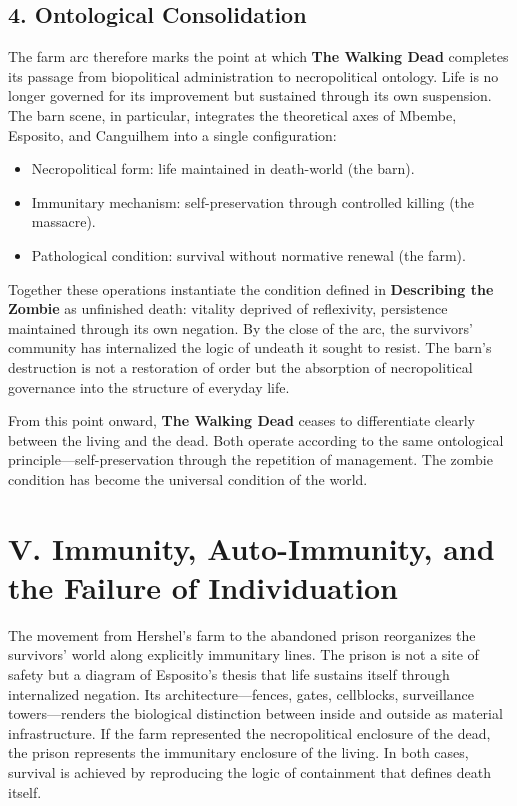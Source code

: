 \documentclass[11pt]{article}
\begin{document}
\subsection*{4. Ontological Consolidation}
\label{sec:org6c1e42b}

The farm arc therefore marks the point at which \textbf{The Walking Dead} completes its passage from biopolitical administration to necropolitical ontology.  Life is no longer governed for its improvement but sustained through its own suspension.  The barn scene, in particular, integrates the theoretical axes of Mbembe, Esposito, and Canguilhem into a single configuration:  

\begin{itemize}
\item Necropolitical form: life maintained in death-world (the barn).
\item Immunitary mechanism: self-preservation through controlled killing (the massacre).
\item Pathological condition: survival without normative renewal (the farm).
\end{itemize}

Together these operations instantiate the condition defined in \textbf{Describing the Zombie} as unfinished death: vitality deprived of reflexivity, persistence maintained through its own negation.  By the close of the arc, the survivors’ community has internalized the logic of undeath it sought to resist.  The barn’s destruction is not a restoration of order but the absorption of necropolitical governance into the structure of everyday life.  

From this point onward, \textbf{The Walking Dead} ceases to differentiate clearly between the living and the dead.  Both operate according to the same ontological principle—self-preservation through the repetition of management.  The zombie condition has become the universal condition of the world.  
\section*{V. Immunity, Auto-Immunity, and the Failure of Individuation}
\label{sec:org05dd13a}

The movement from Hershel’s farm to the abandoned prison reorganizes the survivors’ world along explicitly immunitary lines.  The prison is not a site of safety but a diagram of Esposito’s thesis that life sustains itself through internalized negation.  Its architecture—fences, gates, cellblocks, surveillance towers—renders the biological distinction between inside and outside as material infrastructure.  If the farm represented the necropolitical enclosure of the dead, the prison represents the immunitary enclosure of the living.  In both cases, survival is achieved by reproducing the logic of containment that defines death itself.  
\end{document}
